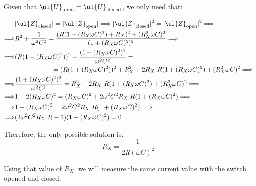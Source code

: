 \begin{ejercicio}[Wechselstromparadoxon]
    Given that $\ul{U}_{\text{open}}= \ul{U}_{\text{closed}}$, we only need that:

    \begin{align*}
        &|\ul{Z}_{\text{closed}}| = |\ul{Z}_{\text{open}}|
        \Longrightarrow
        |\ul{Z}_{\text{closed}}|^2 = |\ul{Z}_{\text{open}}|^2
        \Longrightarrow\\
        \Longrightarrow& R^2 + \dfrac{1}{\omega^2C^2}
        =  \dfrac{(R(1 + (R_X\omega C)^2) + R_X)^2+ (R_X^2\omega C)^2}{(1 + (R_X\omega C)^2)^2}
        \Longrightarrow\\
        \Longrightarrow& (R(1 + (R_X\omega C)^2))^2 + \dfrac{(1 + (R_X\omega C)^2)^2}{\omega^2C^2}
        =\\&\hspace{2cm}=  (R(1 + (R_X\omega C)^2))^2 + R_X^2 + 2R_X\ R(1 + (R_X\omega C)^2) + (R_X^2\omega C)^2
        \Longrightarrow\\
        \Longrightarrow& \dfrac{(1 + (R_X\omega C)^2)^2}{\omega^2C^2}
        =  R_X^2 + 2R_X\ R(1 + (R_X\omega C)^2) + (R_X^2\omega C)^2
        \Longrightarrow\\
        \Longrightarrow& 1 + 2(R_X\omega C)^2= (R_X\omega C)^2 + 2\omega^2C^2 R_X\ R(1 + (R_X\omega C)^2)
        \Longrightarrow\\
        \Longrightarrow& 1 + (R_X\omega C)^2= 2\omega^2C^2 R_X\ R(1 + (R_X\omega C)^2)
        \Longrightarrow\\
        \Longrightarrow& (2\omega^2C^2 R_X\ R-1)(1 + (R_X\omega C)^2) = 0
    \end{align*}

    Therefore, the only possible solution is:
    \begin{equation*}
        R_X = \dfrac{1}{2R (\omega C)^2}
    \end{equation*}

    Using that value of $R_X$, we will measure the same current value with the switch opened and closed.
    
\end{ejercicio}